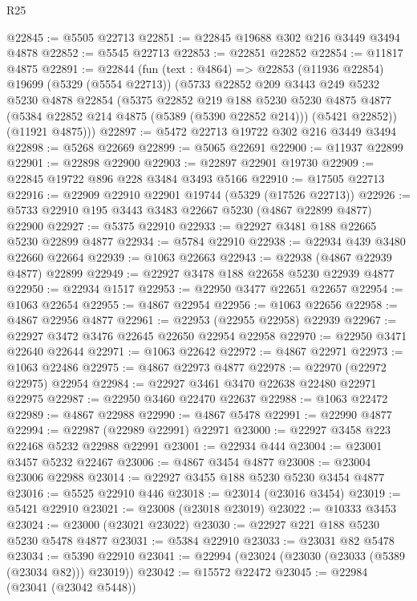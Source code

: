 \begin{lexlean}{R25}
\begin{coremodule}
@22845 := @5505 @22713
@22851 := @22845 @19688 @302 @216 @3449 @3494 @4878
@22852 := @5545 @22713
@22853 := @22851 @22852
@22854 := @11817 @4875
@22891 := @22844
    (fun (text : @4864) =>
    @22853
      (@11936 @22854)
      @19699
      (@5329 (@5554 @22713))
      (@5733
        @22852
        @209
        @3443
        @249
        @5232
        @5230
        @4878
        @22854
        (@5375
          @22852
          @219
          @188
          @5230
          @5230
          @4875
          @4877
          (@5384 @22852 @214 @4875 (@5389 (@5390 @22852 @214)))
          (@5421 @22852))
        (@11921 @4875)))
@22897 := @5472 @22713 @19722 @302 @216 @3449 @3494
@22898 := @5268 @22669
@22899 := @5065 @22691
@22900 := @11937 @22899
@22901 := @22898 @22900
@22903 := @22897 @22901 @19730
@22909 := @22845 @19722 @896 @228 @3484 @3493 @5166
@22910 := @17505 @22713
@22916 := @22909 @22910 @22901 @19744 (@5329 (@17526 @22713))
@22926 := @5733 @22910 @195 @3443 @3483 @22667 @5230 (@4867 @22899 @4877) @22900
@22927 := @5375 @22910
@22933 := @22927 @3481 @188 @22665 @5230 @22899 @4877
@22934 := @5784 @22910
@22938 := @22934 @439 @3480 @22660 @22664
@22939 := @1063 @22663
@22943 := @22938 (@4867 @22939 @4877) @22899
@22949 := @22927 @3478 @188 @22658 @5230 @22939 @4877
@22950 := @22934 @1517
@22953 := @22950 @3477 @22651 @22657
@22954 := @1063 @22654
@22955 := @4867 @22954
@22956 := @1063 @22656
@22958 := @4867 @22956 @4877
@22961 := @22953 (@22955 @22958) @22939
@22967 := @22927 @3472 @3476 @22645 @22650 @22954 @22958
@22970 := @22950 @3471 @22640 @22644
@22971 := @1063 @22642
@22972 := @4867 @22971
@22973 := @1063 @22486
@22975 := @4867 @22973 @4877
@22978 := @22970 (@22972 @22975) @22954
@22984 := @22927 @3461 @3470 @22638 @22480 @22971 @22975
@22987 := @22950 @3460 @22470 @22637
@22988 := @1063 @22472
@22989 := @4867 @22988
@22990 := @4867 @5478
@22991 := @22990 @4877
@22994 := @22987 (@22989 @22991) @22971
@23000 := @22927 @3458 @223 @22468 @5232 @22988 @22991
@23001 := @22934 @444
@23004 := @23001 @3457 @5232 @22467
@23006 := @4867 @3454 @4877
@23008 := @23004 @23006 @22988
@23014 := @22927 @3455 @188 @5230 @5230 @3454 @4877
@23016 := @5525 @22910 @446
@23018 := @23014 (@23016 @3454)
@23019 := @5421 @22910
@23021 := @23008 (@23018 @23019)
@23022 := @10333 @3453
@23024 := @23000 (@23021 @23022)
@23030 := @22927 @221 @188 @5230 @5230 @5478 @4877
@23031 := @5384 @22910
@23033 := @23031 @82 @5478
@23034 := @5390 @22910
@23041 := @22994 (@23024 (@23030 (@23033 (@5389 (@23034 @82))) @23019))
@23042 := @15572 @22472
@23045 := @22984 (@23041 (@23042 @5448))

\end{coremodule}
\end{lexlean}

